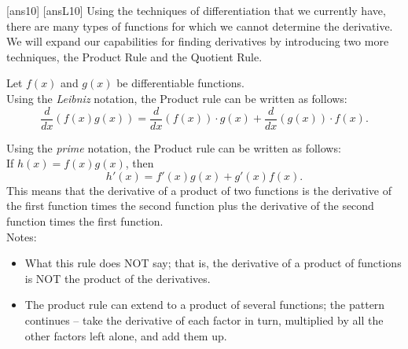 \newpage
[ans10]
[ansL10]
\noindent Using the techniques of differentiation that we currently have, there are many types of functions for which we cannot determine the derivative.  We will expand our capabilities for finding derivatives by introducing two more techniques, the Product Rule and the Quotient Rule.  
\begin{tcolorbox}[title = {Product Rule}]

\noindent Let $f(x)$ and $g(x)$ be differentiable functions. \\

Using the \emph{Leibniz} notation, the Product rule can be written as follows: 
\begin{equation}\label{eq:productRuleLeibniz}
\frac{d}{dx}(f(x)g(x))=\frac{d}{dx}(f(x))\cdot g(x)+\frac{d}{dx}(g(x))\cdot f(x).
\end{equation}

Using the \emph{prime} notation, the Product rule can be written as follows: \\

If $h(x)=f(x)g(x)$, then
\begin{equation}\label{eq:productRulePrime}
h'(x)=f'(x)g(x)+g'(x)f(x).
\end{equation}
This means that the derivative of a product of two functions is the derivative of the first function times the second function plus the derivative of the second function times the first function.\\

Notes:
\begin{itemize}
    \item What this rule does NOT say; that is, the derivative of a product of functions is NOT the product of the derivatives.
    \item The product rule can extend to a product of several functions; the pattern continues – take the derivative of each factor in turn, multiplied by all the other factors left alone, and add them up.
\end{itemize}
\end{tcolorbox}

